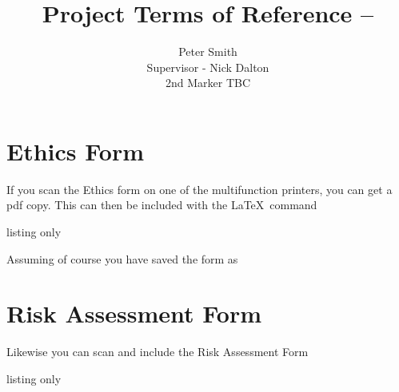 \documentclass[12pt]{article}
\title{Project Terms of Reference -- }
\author{Peter Smith \\
\small Supervisor - Nick Dalton\\
\small 2nd Marker TBC
}
\begin{document}
\maketitle


\printbibliography
\appendix

\section{Ethics Form}
If you scan the Ethics form on one of the multifunction printers, you can get a pdf copy.  This can then be included with the \LaTeX\ command
\begin{tcblisting}{listing only}

\end{tcblisting}
Assuming of course you have saved the form  as 


\section{Risk Assessment Form}
Likewise you can scan and include the Risk Assessment Form
\begin{tcblisting}{listing only}

\end{tcblisting}
\end{document}
